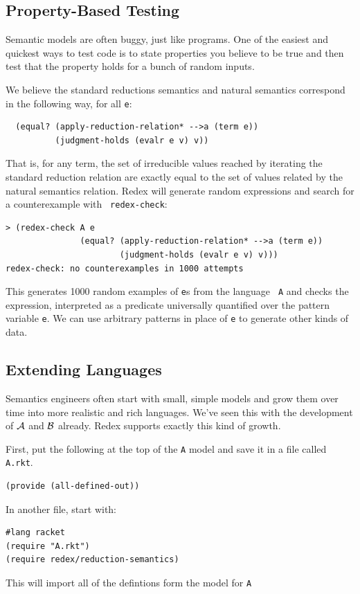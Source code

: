 \subsection{Property-Based Testing}

Semantic models are often buggy, just like programs.  One of the
easiest and quickest ways to test code is to state properties you
believe to be true and then test that the property holds for a bunch
of random inputs.

We believe the standard reductions semantics and natural semantics
correspond in the following way, for all {\tt e}:
\begin{verbatim}
  (equal? (apply-reduction-relation* -->a (term e))
          (judgment-holds (evalr e v) v))
\end{verbatim}
That is, for any term, the set of irreducible values reached by
iterating the standard reduction relation are exactly equal to the set
of values related by the natural semantics relation.  Redex will
generate random expressions and search for a counterexample with {\tt
  redex-check}:
\begin{verbatim}                                                                          
> (redex-check A e
               (equal? (apply-reduction-relation* -->a (term e))
                       (judgment-holds (evalr e v) v)))
redex-check: no counterexamples in 1000 attempts
\end{verbatim}
This generates 1000 random examples of {\tt e}s from the language {\tt
  A} and checks the expression, interpreted as a predicate universally
quantified over the pattern variable {\tt e}.  We can use arbitrary
patterns in place of {\tt e} to generate other kinds of data.

\subsection{Extending Languages}

Semantics engineers often start with small, simple models and grow
them over time into more realistic and rich languages.  We've seen
this with the development of $\mathcal{A}$ and $\mathcal{B}$ already.  Redex
supports exactly this kind of growth.

First, put the following at the top of the {\tt A} model and save it
in a file called {\tt A.rkt}.
\begin{verbatim}
(provide (all-defined-out))
\end{verbatim}

In another file, start with:
\begin{verbatim}
#lang racket
(require "A.rkt")
(require redex/reduction-semantics)
\end{verbatim}
This will import all of the defintions form the model for {\tt A}


